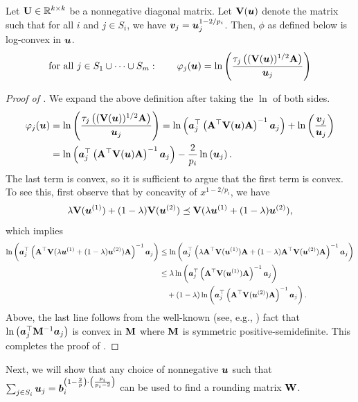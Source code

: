 \documentclass[11pt]{article}
\numberwithin{equation}{section}
\begin{document}
\begin{lemma}
\label{lemma:blw_convex_potential_general}
Let $\mathbf{U} \in \mathbb{R}^{k \times k}$ be a nonnegative diagonal matrix. Let $\mathbf{V}(\bm{u})$ denote the matrix such that for all $i$ and $j \in S_i$, we have $\bm{v}_j = \bm{u}_j^{1-2/p_i}$. Then, $\phi$ as defined below is log-convex in $\bm{u}$.
\begin{align*}
    \text{for all } j \in S_1 \cup \dots \cup S_m:\quad\quad\varphi_j(\bm{u}) = \ln\left(\frac{\tau_j\left((\mathbf{V}(\bm{u}))^{1/2}\mathbf{A}\right)}{\bm{u}_j}\right)
\end{align*}
\end{lemma}
\begin{proof}[Proof of ]
We expand the above definition after taking the $\ln$ of both sides.
\begin{align*}
    \varphi_j(\bm{u}) &= \ln\left(\frac{\tau_j\left((\mathbf{V}(\bm{u}))^{1/2}\mathbf{A}\right)}{\bm{u}_j}\right) = \ln\left(\bm{a}_j^{\top}\left(\mathbf{A}^{\top}\mathbf{V}(\bm{u})\mathbf{A}\right)^{-1}\bm{a}_j\right) + \ln\left(\frac{\bm{v}_j}{\bm{u}_j}\right) \\
    &= \ln\left(\bm{a}_j^{\top}\left(\mathbf{A}^{\top}\mathbf{V}(\bm{u})\mathbf{A}\right)^{-1}\bm{a}_j\right) - \frac{2}{p_i}\ln\left(\bm{u}_j\right).
\end{align*}
The last term is convex, so it is sufficient to argue that the first term is convex. To see this, first observe that by concavity of $x^{1-2/p_i}$, we have
\begin{align*}
    \lambda\mathbf{V}(\bm{u}^{(1)}) + (1-\lambda)\mathbf{V}(\bm{u}^{(2)}) \preceq \mathbf{V}(\lambda\bm{u}^{(1)} + (1-\lambda)\bm{u}^{(2)}),
\end{align*}
which implies
\begin{align*}
    \ln\left(\bm{a}_j^{\top}\left(\mathbf{A}^{\top}\mathbf{V}(\lambda\bm{u}^{(1)} + (1-\lambda)\bm{u}^{(2)})\mathbf{A}\right)^{-1}\bm{a}_j\right) &\le \ln\left(\bm{a}_j^{\top}\left(\lambda\mathbf{A}^{\top}\mathbf{V}(\bm{u}^{(1)})\mathbf{A} + (1-\lambda)\mathbf{A}^{\top}\mathbf{V}(\bm{u}^{(2)})\mathbf{A}\right)^{-1}\bm{a}_j\right) \\
    &\le \lambda\ln\left(\bm{a}_j^{\top}\left(\mathbf{A}^{\top}\mathbf{V}(\bm{u}^{(1)})\mathbf{A}\right)^{-1}\bm{a}_j\right) \\
    &\quad + (1-\lambda)\ln\left(\bm{a}_j^{\top}\left(\mathbf{A}^{\top}\mathbf{V}(\bm{u}^{(2)})\mathbf{A}\right)^{-1}\bm{a}_j\right).
\end{align*}
Above, the last line follows from the well-known (see, e.g., \cite[Lemma 3.4]{ccly19}) fact that $\ln\left(\bm{a}_j^{\top}\mathbf{M}^{-1}\bm{a}_j\right)$ is convex in $\mathbf{M}$ where $\mathbf{M}$ is symmetric positive-semidefinite. This completes the proof of .
\end{proof}

Next, we will show that any choice of nonnegative $\bm{u}$ such that $\sum_{j \in S_i} \bm{u}_j = \bm{b}_i^{\left(1-\frac{2}{p}\right)\cdot\left(\frac{p_i}{p_i-2}\right)}$ can be used to find a rounding matrix $\mathbf{W}$.
\end{document}
